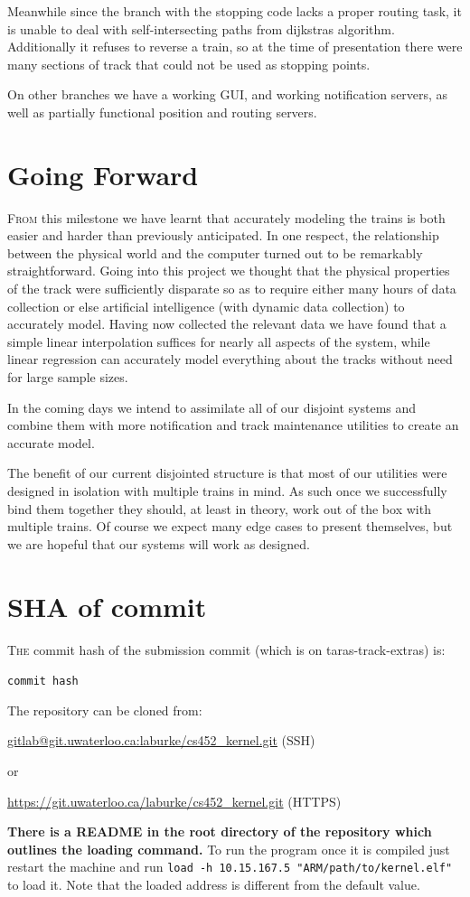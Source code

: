 \documentclass{amsart}
\begin{document}
Meanwhile since the branch with the stopping code lacks a proper routing task,
it is unable to deal with self-intersecting paths from dijkstras algorithm.
Additionally it refuses to reverse a train, so at the time of presentation there
were many sections of track that could not be used as stopping points.

On other branches we have a working GUI, and working notification servers, as
well as partially functional position and routing servers.

\clearpage

\section*{Going Forward}

\textsc{From} this milestone we have learnt that accurately modeling the trains
is both easier and harder than previously anticipated. In one respect, the
relationship between the physical world and the computer turned out to be
remarkably straightforward. Going into this project we thought that the physical
properties of the track were sufficiently disparate so as to require either many
hours of data collection or else artificial intelligence (with dynamic data
collection) to accurately model. Having now collected the relevant data we have
found that a simple linear interpolation suffices for nearly all aspects of the
system, while linear regression can accurately model everything about the tracks
without need for large sample sizes.

In the coming days we intend to assimilate all of our disjoint systems and
combine them with more notification and track maintenance utilities to create an
accurate model.

The benefit of our current disjointed structure is that most of our utilities
were designed in isolation with multiple trains in mind. As such once we
successfully bind them together they should, at least in theory, work out of the
box with multiple trains. Of course we expect many edge cases to present
themselves, but we are hopeful that our systems will work as designed.

\section*{SHA of commit}

\textsc{The} commit hash of the submission commit (which is on
taras-track-extras) is:

\texttt{{{{commit hash}}}}

\noindent The repository can be cloned from:

\url{gitlab@git.uwaterloo.ca:laburke/cs452_kernel.git} (SSH)

or

\url{https://git.uwaterloo.ca/laburke/cs452_kernel.git} (HTTPS)

\textbf{There is a README in the root directory of the repository which outlines
the loading command.} To run the program once it is compiled just restart the
machine and run \texttt{load -h 10.15.167.5
"ARM/path/to/kernel.elf"} to load it. Note that the loaded address is different
from the default value.
\end{document}
